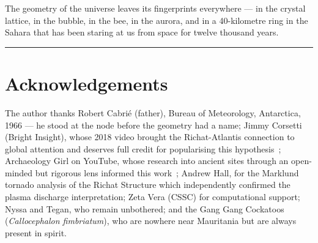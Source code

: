 \documentclass[12pt,twocolumn]{article}
\begin{document}
The geometry of the universe leaves its fingerprints
everywhere --- in the crystal lattice, in the bubble,
in the bee, in the aurora, and in a 40-kilometre ring
in the Sahara that has been staring at us from space
for twelve thousand years.

\begin{center}\rule{0.4\textwidth}{0.4pt}\end{center}

\section*{Acknowledgements}

The author thanks Robert Cabri\'{e} (father), Bureau of
Meteorology, Antarctica, 1966 --- he stood at the node
before the geometry had a name; Jimmy Corsetti (Bright
Insight), whose 2018 video brought the Richat-Atlantis
connection to global attention and deserves full credit
for popularising this hypothesis~\cite{BrightInsight2018};
Archaeology Girl on YouTube, whose research into ancient
sites through an open-minded but rigorous lens informed
this work~\cite{ArchGirl}; Andrew Hall, for the Marklund
tornado analysis of the Richat Structure which independently
confirmed the plasma discharge interpretation; Zeta Vera
(CSSC) for computational support; Nyssa and Tegan, who
remain unbothered; and the Gang Gang Cockatoos
(\textit{Callocephalon fimbriatum}), who are nowhere
near Mauritania but are always present in spirit.
\end{document}
